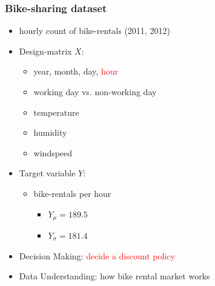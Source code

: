 \documentclass{beamer}
\newcommand{\red}[1]{\textcolor{red}{#1}}
\begin{document}


\begin{frame}
  \frametitle{Bike-sharing dataset}
  \begin{itemize}
  \item hourly count of bike-rentals (2011, 2012)
  \item Design-matrix $X$:
    \begin{itemize}
    \item year, month, day, \red{hour}
    \item working day vs. non-working day
    \item temperature
    \item humidity
    \item windspeed
    \end{itemize}
  \item Target variable $Y$:
    \begin{itemize}
    \item bike-rentals per hour
      \begin{itemize}
      \item $Y_\mu = 189.5$
      \item $Y_\sigma = 181.4$
      \end{itemize}
    \end{itemize}
  \item Decision Making: \red{decide a discount policy}
  \item Data Understanding: how bike rental market works
  \end{itemize}
\end{frame}
\end{document}
